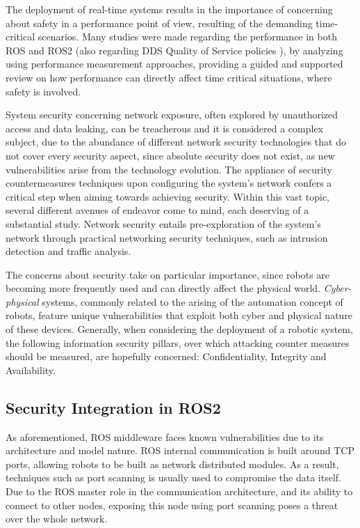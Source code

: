 The deployment of real-time systems results in the importance of concerning about safety in a performance point of view, resulting of the demanding time-critical scenarios. Many studies were made regarding the performance in both ROS and ROS2 (also regarding DDS Quality of Service policies \cite{maruyama2016exploring}), by analyzing using performance measurement approaches, providing a guided and supported review on how performance can directly affect time critical situations, where safety is involved. \cite{maruyama2016exploring, casini2019response} 

System security concerning network exposure, often explored by unauthorized access and data leaking, can be treacherous and it is considered a complex subject, due to the abundance of different network security technologies that do not cover every security aspect, since absolute security does not exist, as new vulnerabilities arise from the technology evolution.\cite{kaeo2004designing} The appliance of security countermeasures techniques upon configuring the system's network confers a critical step when aiming towards achieving security. Within this vast topic, several different avenues of endeavor come to mind, each deserving of a substantial study. Network security entails pre-exploration of the system's network through practical networking security techniques, such as intrusion detection and traffic analysis. \cite{marin2005network}

The concerns about security take on particular importance, since robots are becoming more frequently used and can directly affect the physical world. \textit{Cyber-physical} systems, commonly related to the arising of the automation concept of robots, feature unique vulnerabilities that exploit both cyber and physical nature of these devices. \cite{mcclean2013preliminary}Generally, when considering the deployment of a robotic system, the following information security pillars, over which attacking counter measures should be measured, are hopefully concerned: Confidentiality, Integrity and Availability. \cite{white2018procedurally}

\subsection{Security Integration in ROS2}

As aforementioned, ROS middleware faces known vulnerabilities due to its architecture and model nature. ROS internal communication is built around TCP ports, allowing robots to be built as network distributed modules. As a result, techniques such as port scanning is usually used to compromise the data itself. Due to the ROS master role in the communication architecture, and its ability to connect to other nodes, exposing this node using port scanning poses a threat over the whole network. \cite{8794451} 

